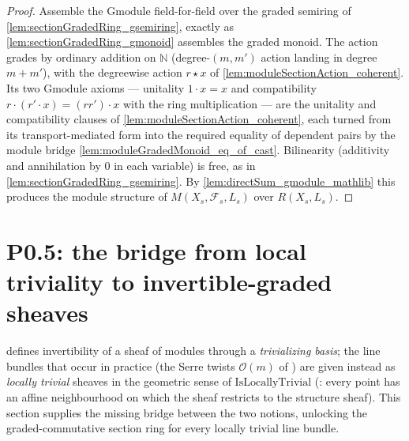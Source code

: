 \begin{proof}
    \leanok
  Assemble the \(\mathrm{Gmodule}\) field-for-field over the graded semiring of
  \cref{lem:sectionGradedRing_gsemiring}, exactly as
  \cref{lem:sectionGradedRing_gmonoid} assembles the graded monoid. The action grades
  by ordinary addition on \(\mathbb{N}\) (degree-\((m,m')\) action landing in degree
  \(m+m'\)), with the degreewise action \(r\star x\) of
  \cref{lem:moduleSectionAction_coherent}. Its two \(\mathrm{Gmodule}\) axioms ---
  unitality \(1 \cdot x = x\) and compatibility \(r \cdot (r' \cdot x) = (rr')\cdot x\)
  with the ring multiplication --- are the unitality and compatibility clauses of
  \cref{lem:moduleSectionAction_coherent}, each turned from its transport-mediated
  form into the required equality of dependent pairs by the module bridge
  \cref{lem:moduleGradedMonoid_eq_of_cast}. Bilinearity (additivity and annihilation by
  \(0\) in each variable) is free, as in \cref{lem:sectionGradedRing_gsemiring}. By
  \cref{lem:directSum_gmodule_mathlib} this produces the module structure of
  \(M(X_s,\mathcal{F}_s,L_s)\) over \(R(X_s,L_s)\).
\end{proof}

\section{P0.5: the bridge from local triviality to invertible-graded sheaves}
\label{sec:sgr_invertibleGr_bridge}

 defines invertibility of a sheaf of modules through
a \emph{trivializing basis}; the line bundles that occur in practice (the
Serre twists \(\mathcal{O}(m)\) of ) are given
instead as \emph{locally trivial} sheaves in the geometric sense of
\(\mathrm{IsLocallyTrivial}\) (: every point has
an affine neighbourhood on which the sheaf restricts to the structure
sheaf). This section supplies the missing bridge between the two notions,
unlocking the graded-commutative section ring
 for every locally trivial line
bundle.

